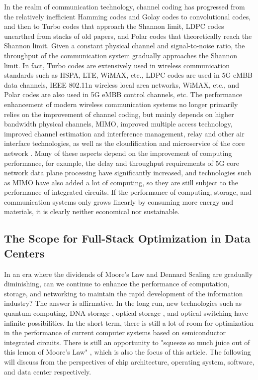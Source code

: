 In the realm of communication technology, channel coding has progressed from the relatively inefficient Hamming codes and Golay codes to convolutional codes, and then to Turbo codes that approach the Shannon limit, LDPC codes unearthed from stacks of old papers, and Polar codes that theoretically reach the Shannon limit. Given a constant physical channel and signal-to-noise ratio, the throughput of the communication system gradually approaches the Shannon limit.
In fact, Turbo codes are extensively used in wireless communication standards such as HSPA, LTE, WiMAX, etc., LDPC codes are used in 5G eMBB data channels, IEEE 802.11n wireless local area networks, WiMAX, etc., and Polar codes are also used in 5G eMBB control channels, etc.
The performance enhancement of modern wireless communication systems no longer primarily relies on the improvement of channel coding, but mainly depends on higher bandwidth physical channels, MIMO, improved multiple access technology, improved channel estimation and interference management, relay and other air interface technologies, as well as the cloudification and microservice of the core network \cite{3gpp-23501,3gpp-38300}. Many of these aspects depend on the improvement of computing performance, for example, the delay and throughput requirements of 5G core network data plane processing have significantly increased, and technologies such as MIMO have also added a lot of computing, so they are still subject to the performance of integrated circuits.
If the performance of computing, storage, and communication systems only grows linearly by consuming more energy and materials, it is clearly neither economical nor sustainable.
\fi

\iffalse
\subsection{The Scope for Full-Stack Optimization in Data Centers}

In an era where the dividends of Moore's Law and Dennard Scaling are gradually diminishing, can we continue to enhance the performance of computation, storage, and networking to maintain the rapid development of the information industry? The answer is affirmative. In the long run, new technologies such as quantum computing, DNA storage \cite{bornholt2016dna}, optical storage \cite{glass-a-new-media-for-a-new-era}, and optical switching \cite{farrington2011helios} have infinite possibilities. In the short term, there is still a lot of room for optimization in the performance of current computer systems based on semiconductor integrated circuits. There is still an opportunity to "squeeze so much juice out of this lemon of Moore's Law" \cite{threebody}, which is also the focus of this article. The following will discuss from the perspectives of chip architecture, operating system, software, and data center respectively.


